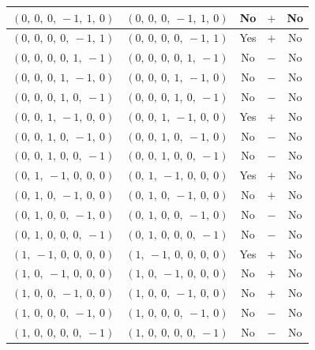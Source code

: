 \documentclass[11pt]{article}
\theoremstyle{definition}
\begin{document}
\begin{center}
\begin{tabular}{|l|l|c|c|c|}
    \hline
    $\left( 0, \  0, \  0, \  -1, \  1, \  0\right)$ & $\left( 0, \  0, \  0, \  -1, \  1, \  0\right)$ & No & $+$ & No \\
    \hline
    $\left( 0, \  0, \  0, \  0, \  -1, \  1\right)$ & $\left( 0, \  0, \  0, \  0, \  -1, \  1\right)$ & Yes & $+$ & No \\
    \hline
    $\left( 0, \  0, \  0, \  0, \  1, \  -1\right)$ & $\left( 0, \  0, \  0, \  0, \  1, \  -1\right)$ & No & $-$ & No \\
    \hline
    $\left( 0, \  0, \  0, \  1, \  -1, \  0\right)$ & $\left( 0, \  0, \  0, \  1, \  -1, \  0\right)$ & No & $-$ & No \\
    \hline
    $\left( 0, \  0, \  0, \  1, \  0, \  -1\right)$ & $\left( 0, \  0, \  0, \  1, \  0, \  -1\right)$ & No & $-$ & No \\
    \hline
    $\left( 0, \  0, \  1, \  -1, \  0, \  0\right)$ & $\left( 0, \  0, \  1, \  -1, \  0, \  0\right)$ & Yes & $+$ & No \\
    \hline
    $\left( 0, \  0, \  1, \  0, \  -1, \  0\right)$ & $\left( 0, \  0, \  1, \  0, \  -1, \  0\right)$ & No & $-$ & No \\
    \hline
    $\left( 0, \  0, \  1, \  0, \  0, \  -1\right)$ & $\left( 0, \  0, \  1, \  0, \  0, \  -1\right)$ & No & $-$ & No \\
    \hline
    $\left( 0, \  1, \  -1, \  0, \  0, \  0\right)$ & $\left( 0, \  1, \  -1, \  0, \  0, \  0\right)$ & Yes & $+$ & No \\
    \hline
    $\left( 0, \  1, \  0, \  -1, \  0, \  0\right)$ & $\left( 0, \  1, \  0, \  -1, \  0, \  0\right)$ & No & $+$ & No \\
    \hline
    $\left( 0, \  1, \  0, \  0, \  -1, \  0\right)$ & $\left( 0, \  1, \  0, \  0, \  -1, \  0\right)$ & No & $-$ & No \\
    \hline
    $\left( 0, \  1, \  0, \  0, \  0, \  -1\right)$ & $\left( 0, \  1, \  0, \  0, \  0, \  -1\right)$ & No & $-$ & No \\
    \hline
    $\left( 1, \  -1, \  0, \  0, \  0, \  0\right)$ & $\left( 1, \  -1, \  0, \  0, \  0, \  0\right)$ & Yes & $+$ & No \\
    \hline
    $\left( 1, \  0, \  -1, \  0, \  0, \  0\right)$ & $\left( 1, \  0, \  -1, \  0, \  0, \  0\right)$ & No & $+$ & No \\
    \hline
    $\left( 1, \  0, \  0, \  -1, \  0, \  0\right)$ & $\left( 1, \  0, \  0, \  -1, \  0, \  0\right)$ & No & $+$ & No \\
    \hline
    $\left( 1, \  0, \  0, \  0, \  -1, \  0\right)$ & $\left( 1, \  0, \  0, \  0, \  -1, \  0\right)$ & No & $-$ & No \\
    \hline
    $\left( 1, \  0, \  0, \  0, \  0, \  -1\right)$ & $\left( 1, \  0, \  0, \  0, \  0, \  -1\right)$ & No & $-$ & No \\
    \hline
\end{tabular}
\end{center}
\end{document}

